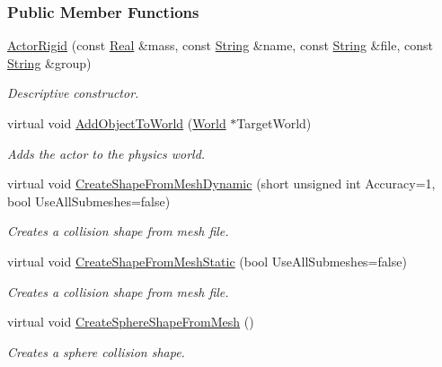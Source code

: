\subsubsection*{Public Member Functions}
\begin{DoxyCompactItemize}
\item 
\hyperlink{classphys_1_1ActorRigid_a3005e81009d9b5b5bfb9a6f5068917d3}{ActorRigid} (const \hyperlink{namespacephys_af7eb897198d265b8e868f45240230d5f}{Real} \&mass, const \hyperlink{namespacephys_aa03900411993de7fbfec4789bc1d392e}{String} \&name, const \hyperlink{namespacephys_aa03900411993de7fbfec4789bc1d392e}{String} \&file, const \hyperlink{namespacephys_aa03900411993de7fbfec4789bc1d392e}{String} \&group)
\begin{DoxyCompactList}\small\item\em Descriptive constructor. \item\end{DoxyCompactList}\item 
virtual void \hyperlink{classphys_1_1ActorRigid_acaf29ca7058b39185dd09a5059200e91}{AddObjectToWorld} (\hyperlink{classphys_1_1World}{World} $\ast$TargetWorld)
\begin{DoxyCompactList}\small\item\em Adds the actor to the physics world. \item\end{DoxyCompactList}\item 
virtual void \hyperlink{classphys_1_1ActorRigid_a78f2f2dfc8b35f13e9a7680189bbdd48}{CreateShapeFromMeshDynamic} (short unsigned int Accuracy=1, bool UseAllSubmeshes=false)
\begin{DoxyCompactList}\small\item\em Creates a collision shape from mesh file. \item\end{DoxyCompactList}\item 
virtual void \hyperlink{classphys_1_1ActorRigid_a5adfa6199955f9c0de4e0af54aeb96f6}{CreateShapeFromMeshStatic} (bool UseAllSubmeshes=false)
\begin{DoxyCompactList}\small\item\em Creates a collision shape from mesh file. \item\end{DoxyCompactList}\item 
virtual void \hyperlink{classphys_1_1ActorRigid_ae401c116a07ee4ed3fc677e83308fba5}{CreateSphereShapeFromMesh} ()
\begin{DoxyCompactList}\small\item\em Creates a sphere collision shape. \item\end{DoxyCompactList}\item 

\end{DoxyCompactItemize}
